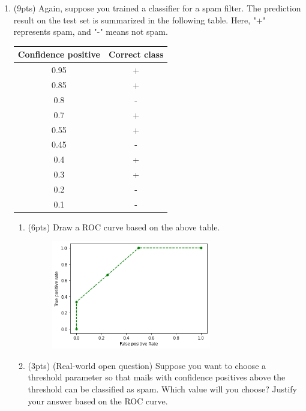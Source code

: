 \documentclass[a4paper]{article}
\theoremstyle{definition}
\newenvironment{soln}{
    \leavevmode\color{blue}\ignorespaces
}{}
\begin{document}
\begin{enumerate}
\item (9pts) Again, suppose you trained a classifier for a spam filter. The prediction result on the test set is summarized in the following table. Here, "+" represents spam, and "-" means not spam.

\begin{center}
\begin{tabular}{ c  c }
\hline
Confidence positive & Correct class \\ \hline
0.95 & + \\
0.85 & + \\
0.8 & - \\
0.7 & + \\
0.55 & + \\
0.45 & - \\
0.4 & + \\
0.3 & + \\
0.2 & - \\
0.1 & - \\
\hline
\end{tabular}
\end{center}

\begin{enumerate}
	\item (6pts) Draw a ROC curve based on the above table.
	
	\begin{soln}  		\begin{figure}[H]
			\centering
			\includegraphics[width=0.7\textwidth]{rocM.png}
		\end{figure} \end{soln}
	
	\item (3pts) (Real-world open question) Suppose you want to choose a threshold parameter so that mails with confidence positives above the threshold can be classified as spam. Which value will you choose? Justify your answer based on the ROC curve.
	

\end{enumerate}
\end{enumerate}
\end{document}
